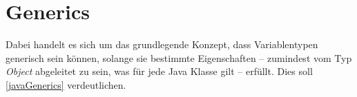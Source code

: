\section{Generics}
 Dabei handelt es sich um das grundlegende Konzept, dass Variablentypen generisch sein können, solange sie bestimmte Eigenschaften -- zumindest vom Typ \textit{Object} abgeleitet zu sein, was für jede Java Klasse gilt -- erfüllt. Dies soll \autoref{javaGenerics} verdeutlichen.
